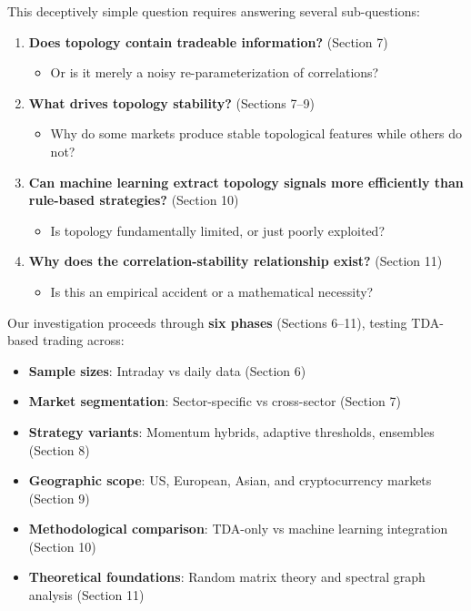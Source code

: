 This deceptively simple question requires answering several sub-questions:

\begin{enumerate}
\item \textbf{Does topology contain tradeable information?} (Section 7)
   \begin{itemize}
   \item Or is it merely a noisy re-parameterization of correlations?
   \end{itemize}

\item \textbf{What drives topology stability?} (Sections 7--9)
   \begin{itemize}
   \item Why do some markets produce stable topological features while others do not?
   \end{itemize}

\item \textbf{Can machine learning extract topology signals more efficiently than rule-based strategies?} (Section 10)
   \begin{itemize}
   \item Is topology fundamentally limited, or just poorly exploited?
   \end{itemize}

\item \textbf{Why does the correlation-stability relationship exist?} (Section 11)
   \begin{itemize}
   \item Is this an empirical accident or a mathematical necessity?
   \end{itemize}
\end{enumerate}

Our investigation proceeds through \textbf{six phases} (Sections 6--11), testing TDA-based trading across:
\begin{itemize}
\item \textbf{Sample sizes}: Intraday vs daily data (Section 6)
\item \textbf{Market segmentation}: Sector-specific vs cross-sector (Section 7)
\item \textbf{Strategy variants}: Momentum hybrids, adaptive thresholds, ensembles (Section 8)
\item \textbf{Geographic scope}: US, European, Asian, and cryptocurrency markets (Section 9)
\item \textbf{Methodological comparison}: TDA-only vs machine learning integration (Section 10)
\item \textbf{Theoretical foundations}: Random matrix theory and spectral graph analysis (Section 11)
\end{itemize}

